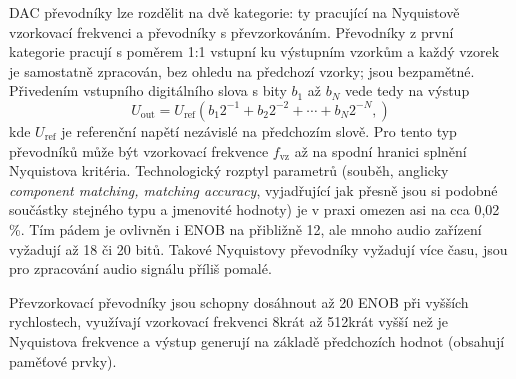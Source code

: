 DAC převodníky lze rozdělit na dvě kategorie: ty pracující na Nyquistově vzorkovací frekvenci a převodníky s převzorkováním. Převodníky z první kategorie pracují s poměrem 1:1 vstupní ku výstupním vzorkům a každý vzorek je samostatně zpracován, bez ohledu na předchozí vzorky; jsou bezpamětné. 
Přivedením vstupního digitálního slova s bity $b_1$ až $b_N$ vede tedy na výstup
\begin{equation}
    U_{\mathrm{out}} = U_{\mathrm{ref}} \left( b_1 2^{-1} + b_2 2^{-2} + \cdots + b_N 2^{-N}, \right)
\end{equation}
kde $U_{\mathrm{ref}}$ je referenční napětí nezávislé na předchozím slově. Pro tento typ převodníků může být vzorkovací frekvence $f_{\mathrm{vz}}$ až na spodní hranici splnění Nyquistova kritéria. 
Technologický rozptyl parametrů (souběh, anglicky \textit{component matching, match\-ing ac\-cu\-ra\-cy}, vyjadřující jak přesně jsou si podobné součástky stejného typu a jmenovité hodnoty) je v praxi omezen asi na cca 0,02 \%. Tím pádem je ovlivněn i \ac{ENOB} na přibližně 12, ale mnoho audio zařízení vyžadují až 18 či 20 bitů. Takové Nyquistovy převodníky vyžadují více času, jsou pro zpracování audio signálu příliš pomalé.

Převzorkovací převodníky jsou schopny dosáhnout až 20 ENOB při vyšších rychlostech, využívají vzorkovací frekvenci 8krát až 512krát vyšší než je Nyquistova frekvence a výstup generují na základě předchozích hodnot (obsahují paměťové prvky). 


